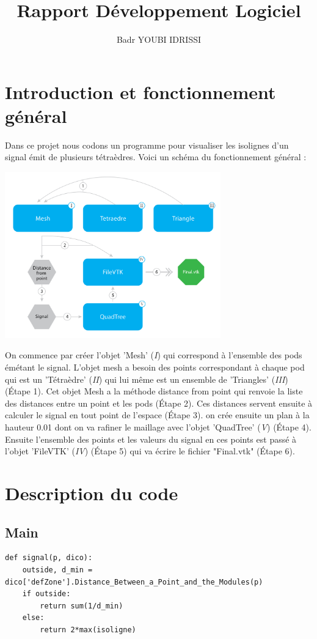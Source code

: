 \documentclass[french]{article}
\title{Rapport Développement Logiciel}
\author{Badr YOUBI IDRISSI}
\begin{document}
	
\section{Introduction et fonctionnement général}

Dans ce projet nous codons un programme pour visualiser les isolignes 
d'un signal émit de plusieurs tétraèdres. Voici un schéma du fonctionnement
général :

\begin{center}
	\includegraphics[width=0.7\textwidth]{Figures/SchemaNum.png}
\end{center}

On commence par créer l'objet 'Mesh' (\textit{I}) qui correspond à l'ensemble des pods émétant le signal.
L'objet mesh a besoin des points correspondant à chaque pod qui est un 'Tétraèdre' (\textit{II}) qui lui
même est un ensemble de 'Triangles' (\textit{III}) (\'Etape 1). Cet objet Mesh a la méthode distance from point qui 
renvoie la liste des distances entre un point et les pods (\'Etape 2). Ces distances servent ensuite à calculer le signal
en tout point de l'espace (\'Etape 3). on crée ensuite un plan à la hauteur 0.01 dont on va rafiner le maillage
avec l'objet 'QuadTree' (\textit{V}) (\'Etape 4). Ensuite l'ensemble des points et les valeurs du signal en ces points est
passé à l'objet 'FileVTK' (\textit{IV}) (\'Etape 5) qui va écrire le fichier "Final.vtk" (\'Etape 6).

\section{Description du code}
	
\subsection{Main}
\begin{verbatim}
def signal(p, dico):
	outside, d_min = dico['defZone'].Distance_Between_a_Point_and_the_Modules(p)
	if outside:
		return sum(1/d_min)
	else:
		return 2*max(isoligne)
\end{verbatim}
\end{document}
